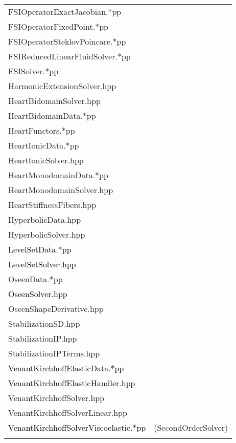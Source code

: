 \documentclass[10p]{article}
\newcommand{\newparts}[1]{\textcolor{black}{#1}}
\theoremstyle{definition}
\begin{document}
\begin{landscape}
\begin{table}[!h]
\begin{multicols}{4}
\begin{xtabular}{
p{0.28\textwidth}<{}
p{0.1\textwidth}<{}
}
FSIOperatorExactJacobian.*pp & \\
FSIOperatorFixedPoint.*pp & \\
FSIOperatorSteklovPoincare.*pp & \\
FSIReducedLinearFluidSolver.*pp & \\
FSISolver.*pp & \\
HarmonicExtensionSolver.hpp & \\
HeartBidomainSolver.hpp & \\
HeartBidomainData.*pp & \\
HeartFunctors.*pp & \\
HeartIonicData.*pp & \\
HeartIonicSolver.hpp & \\
HeartMonodomainData.*pp & \\
HeartMonodomainSolver.hpp & \\
HeartStiffnessFibers.hpp & \\
HyperbolicData.hpp & \\
HyperbolicSolver.hpp & \\
\newparts{LevelSetData.*pp} & \\
\newparts{LevelSetSolver.hpp} & \\
OseenData.*pp & \\
\newparts{OseenSolver.hpp} & \\
OseenShapeDerivative.hpp & \\
StabilizationSD.hpp & \\
StabilizationIP.hpp & \\
StabilizationIPTerms.hpp & \\
\newparts{VenantKirchhoffElasticData.*pp} & \\
\newparts{VenantKirchhoffElasticHandler.hpp} & \\
VenantKirchhoffSolver.hpp & \\
VenantKirchhoffSolverLinear.hpp & \\
\newparts{VenantKirchhoffSolverViscoelastic.*pp} & (SecondOrderSolver)\\
& \\
\end{xtabular}

\end{multicols}
\normalsize\selectfont
\end{table}
\end{landscape}
\end{document}
